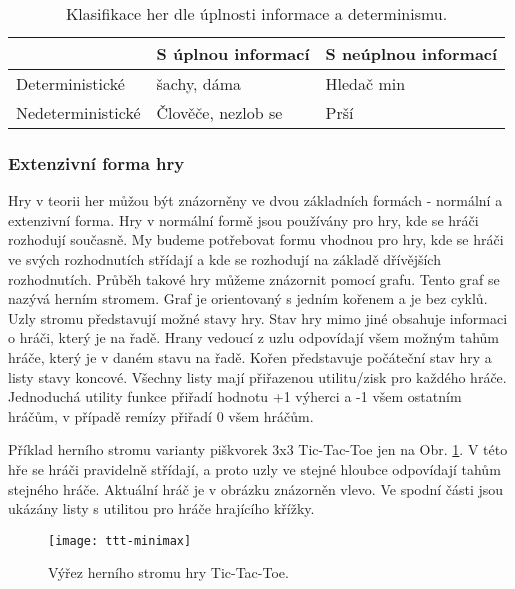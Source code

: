 \begin{table*}[b]\footnotesize
\vspace*{0mm}
\caption{{\label{tab:klasifikaceher}} Klasifikace her dle úplnosti informace a determinismu.}
\vspace*{0mm}
\label{shadowtable}
\begin{center}
\begin{tabular}{ l || l | l |}
 & S úplnou informací & S neúplnou informací \\
\hline
\hline
Deterministické & šachy, dáma & Hledač min \\ \hline
Nedeterministické  & Člověče, nezlob se & Prší \\ \hline
\end{tabular}
\end{center}
\end{table*}

\subsubsection{Extenzivní forma hry}

Hry v teorii her můžou být znázorněny ve dvou základních formách - normální a extenzivní forma. Hry v normální formě jsou používány pro hry, kde se hráči rozhodují současně. My budeme potřebovat formu vhodnou pro hry, kde se hráči ve svých rozhodnutích střídají a kde se rozhodují na základě dřívějších rozhodnutích. Průběh takové hry můžeme znázornit pomocí grafu. Tento graf se nazývá herním stromem. Graf je orientovaný s jedním kořenem a je bez cyklů. Uzly stromu představují možné stavy hry. Stav hry mimo jiné obsahuje informaci o hráči, který je na řadě. Hrany vedoucí z uzlu odpovídají všem možným tahům hráče, který je v daném stavu na řadě. Kořen představuje počáteční stav hry a listy stavy koncové. Všechny listy mají přiřazenou utilitu/zisk pro každého hráče. Jednoduchá utility funkce přiřadí hodnotu +1 výherci a -1 všem ostatním hráčům, v případě remízy přiřadí 0 všem hráčům.

Příklad herního stromu varianty piškvorek 3x3 Tic-Tac-Toe jen na Obr. \ref{fig-ttt-minimax}. V této hře se hráči pravidelně střídají, a proto uzly ve stejné hloubce odpovídají tahům stejného hráče. Aktuální hráč je v obrázku znázorněn vlevo. Ve spodní části jsou ukázány listy s utilitou pro hráče hrajícího křížky.

\begin{figure}
  \centering
  \texttt{[image: ttt-minimax]}
	\caption{ Výřez herního stromu hry Tic-Tac-Toe. }
	\label{fig-ttt-minimax}
\end{figure}

